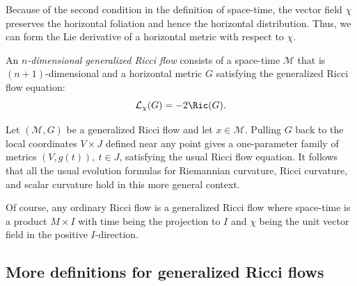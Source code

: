 Because of the second condition in the definition of space-time, the
vector field $\chi$ preserves the horizontal foliation and hence the
horizontal distribution. Thus, we can form the Lie derivative of a
horizontal metric with respect to $\chi$.

\begin{definition}\label{def:generalized-ricci-flow}
\leanok

An {\em $n$-dimensional generalized Ricci flow} consists of a space-time ${\mathcal M}$ that is
$(n+1)$-dimensional and a horizontal metric $G$ satisfying the
generalized Ricci flow equation:
$${\mathcal L}_\chi(G)=-2\Ric(G).$$
\end{definition}


\begin{remark}\label{rem:generalized-ricci-flow-local}

Let $({\mathcal M},G)$ be a generalized Ricci flow and let $x\in
{\mathcal M}$. Pulling $G$ back to  the local coordinates $V\times
J$ defined near any point gives a one-parameter family of metrics
$(V,g(t)),\  t\in J$, satisfying the usual Ricci flow equation. It
follows that all the usual evolution formulas for Riemannian
curvature, Ricci curvature, and scalar curvature hold in this more
general context.
\end{remark}

Of course, any ordinary Ricci flow is a generalized Ricci flow where
space-time is a product $M\times I$ with time being the projection
to $I$ and $\chi$ being the unit vector field in the positive
$I$-direction.


\subsection{More definitions for generalized Ricci flows}

